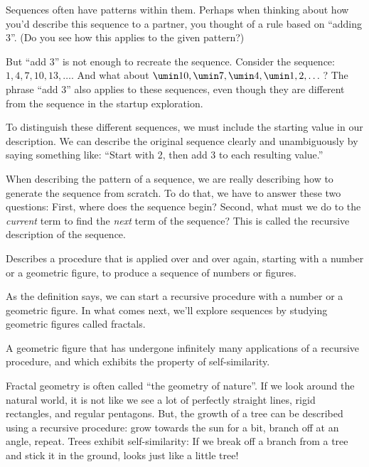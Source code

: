 
Sequences often have patterns within them. Perhaps when thinking about how you'd describe this sequence to a partner, you thought of a rule based on ``adding 3''. (Do you see how this applies to the given pattern?)

But ``add 3'' is not enough to recreate the sequence. Consider the sequence: $1, 4, 7, 10, 13, \dotsc$. And what about $\umin10, \umin7, \umin4, \umin1, 2, \dotsc$? The phrase ``add 3'' also applies to these sequences, even though they are different from the sequence in the startup exploration.

To distinguish these different sequences, we must include the starting value in our description. We can describe the original sequence clearly and unambiguously by saying something like: ``Start with 2, then add 3 to each resulting value.''

When describing the pattern of a sequence, we are really describing how to generate the sequence from scratch. To do that, we have to answer these two questions: First, where does the sequence begin? Second, what must we do to the \textit{current} term to find the \textit{next} term of the sequence? This is called the \gls{recursive} description of the sequence.

\begin{boxdef}[Recursive]
Describes a procedure that is applied over and over again, starting with a number or a geometric figure, to produce a sequence of numbers or figures.
\end{boxdef}

As the definition says, we can start a recursive procedure with a number or a geometric figure. In what comes next, we'll explore sequences by studying geometric figures called \glspl{fractal}.

\begin{boxdef}[Fractal]
A geometric figure that has undergone infinitely many applications of a recursive procedure, and which exhibits the property of self-similarity.
\end{boxdef}

Fractal geometry is often called ``the geometry of nature''. If we look around the natural world, it is not like we see a lot of perfectly straight lines, rigid rectangles, and regular pentagons. But, the growth of a tree can be described using a recursive procedure: grow towards the sun for a bit, branch off at an angle, repeat. Trees exhibit self-similarity: If we break off a branch from a tree and stick it in the ground, looks just like a little tree!

